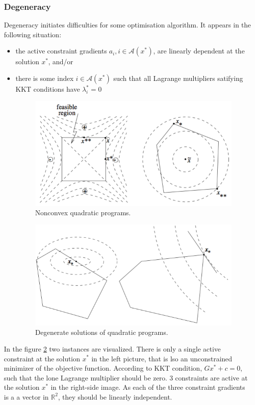 \subsubsection*{Degeneracy}
Degeneracy initiates difficulties for some optimisation algorithm. It appears in the following situation:
\begin{itemize}
	\item the active constraint gradients $a_i,i\in \mathcal{A}(x^*)$, are linearly dependent at the solution $x^*$, and/or
	\item there is some index $i\in \mathcal{A}(x^*)$ such that all Lagrange multipliers satifying KKT conditions have $\lambda_i^* = 0$
	
	\begin{figure}[h]
		\centering
			\includegraphics[scale=0.5]{Figures/Degeneracy_2.png}
			\decoRule
			\caption[hypercube]{Nonconvex quadratic programs.}
		\label{fig:Degeneracy_1}
	\end{figure}
	\begin{figure}[h]
		\centering
			\includegraphics[scale=0.5]{Figures/Degeneracy_1.png}
			\decoRule
			\caption[hypercube]{Degenerate solutions of quadratic programs.}
		\label{fig:Degeneracy_2}
	\end{figure}
\end{itemize}
In the figure \ref{fig:Degeneracy_2} two instances are visualized. There is only a single active constraint at the solution $x^*$ in the left picture, that is lso an unconstrained minimizer of the objective function. According to KKT condition, $Gx^*+c=0$, such that the lone Lagrange multiplier should be zero.  3 constraints are active at the solution $x^*$ in the right-side image. As each of the three constraint gradients is a a vector in $\mathbb{R}^2$, they should be linearly independent.

